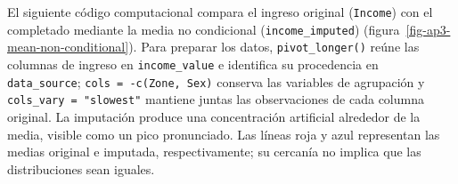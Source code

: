 \documentclass[
  spanish,
  11pt,
  letterpaper,
  oneside,
  open=any]{scrbook}
\newenvironment{Shaded}{\begin{snugshade}}{\end{snugshade}}
\newcommand{\AttributeTok}[1]{\textcolor[rgb]{0.40,0.45,0.13}{#1}}
\newcommand{\FloatTok}[1]{\textcolor[rgb]{0.68,0.00,0.00}{#1}}
\newcommand{\FunctionTok}[1]{\textcolor[rgb]{0.28,0.35,0.67}{#1}}
\newcommand{\NormalTok}[1]{\textcolor[rgb]{0.00,0.23,0.31}{#1}}
\newcommand{\OtherTok}[1]{\textcolor[rgb]{0.00,0.23,0.31}{#1}}
\newcommand{\SpecialCharTok}[1]{\textcolor[rgb]{0.37,0.37,0.37}{#1}}
\newcommand{\StringTok}[1]{\textcolor[rgb]{0.13,0.47,0.30}{#1}}
\begin{document}
El siguiente código computacional compara el ingreso original
(\texttt{Income}) con el completado mediante la media no condicional
(\texttt{income\_imputed}) (figura~\ref{fig-ap3-mean-non-conditional}).
Para preparar los datos, \texttt{pivot\_longer()} reúne las columnas de
ingreso en \texttt{income\_value} e identifica su procedencia en
\texttt{data\_source}; \texttt{cols\ =\ -c(Zone,\ Sex)} conserva las
variables de agrupación y \texttt{cols\_vary\ =\ "slowest"} mantiene
juntas las observaciones de cada columna original. La imputación produce
una concentración artificial alrededor de la media, visible como un pico
pronunciado. Las líneas roja y azul representan las medias original e
imputada, respectivamente; su cercanía no implica que las distribuciones
sean iguales.

\begin{Shaded}
\end{Shaded}
\end{document}
